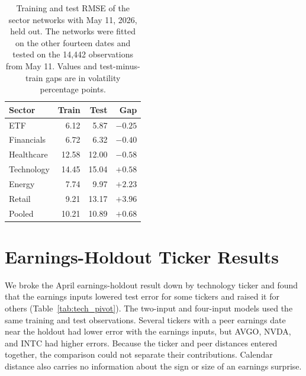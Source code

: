 \begin{table}[H]
\centering
\caption{Training and test RMSE of the sector networks with May 11, 2026, held out. The networks were fitted on the other fourteen dates and tested on the 14{,}442 observations from May 11. Values and test-minus-train gaps are in volatility percentage points.}\label{tab:loo_sector_nn}
\begin{tabular}{lrrr}
\toprule
Sector & Train & Test & Gap \\
\midrule
ETF        &  6.12 &  5.87 & $-0.25$ \\
Financials &  6.72 &  6.32 & $-0.40$ \\
Healthcare & 12.58 & 12.00 & $-0.58$ \\
Technology & 14.45 & 15.04 & $+0.58$ \\
Energy     &  7.74 &  9.97 & $+2.23$ \\
Retail     &  9.21 & 13.17 & $+3.96$ \\
\midrule
Pooled     & 10.21 & 10.89 & $+0.68$ \\
\bottomrule
\end{tabular}
\end{table}

\FloatBarrier
\section{Earnings-Holdout Ticker Results}\label{sec:supp_earnings_diag}

We broke the April earnings-holdout result down by technology ticker and found that the earnings inputs lowered test error for some tickers and raised it for others (Table~\ref{tab:tech_pivot}). The two-input and four-input models used the same training and test observations. Several tickers with a peer earnings date near the holdout had lower error with the earnings inputs, but AVGO, NVDA, and INTC had higher errors. Because the ticker and peer distances entered together, the comparison could not separate their contributions. Calendar distance also carries no information about the sign or size of an earnings surprise.


